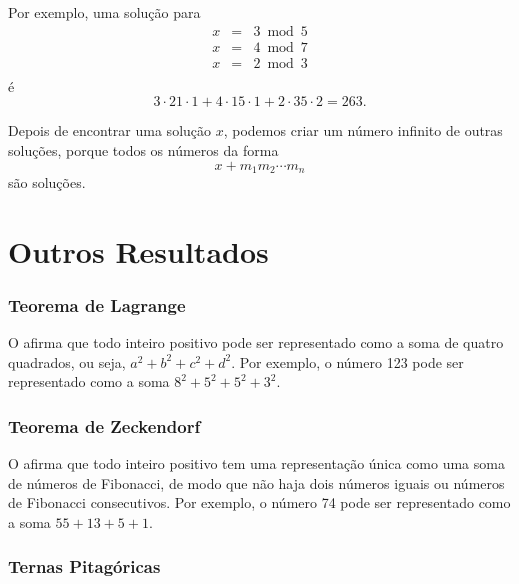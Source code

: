 Por exemplo, uma solução para
\[
\begin{array}{lcl}
x & = & 3 \bmod 5 \\
x & = & 4 \bmod 7 \\
x & = & 2 \bmod 3 \\
\end{array}
\]
é
\[ 3 \cdot 21 \cdot 1 + 4 \cdot 15 \cdot 1 + 2 \cdot 35 \cdot 2 = 263.\]

Depois de encontrar uma solução $x$, podemos criar um número infinito de outras soluções, porque todos os números da forma
\[x+m_1 m_2 \cdots m_n\]
são soluções.

\section{Outros Resultados}

\subsubsection{Teorema de Lagrange}


O 
afirma que todo inteiro positivo pode ser representado como a soma de quatro quadrados, ou seja, $a^2+b^2+c^2+d^2$. Por exemplo, o número 123 pode ser representado como a soma $8^2+5^2+5^2+3^2$.

\subsubsection{Teorema de Zeckendorf}


O 
afirma que todo inteiro positivo tem uma representação única como uma soma de números de Fibonacci, de modo que não haja dois números iguais ou números de Fibonacci consecutivos. Por exemplo, o número 74 pode ser representado como a soma $55+13+5+1$.

\subsubsection{Ternas Pitagóricas}


